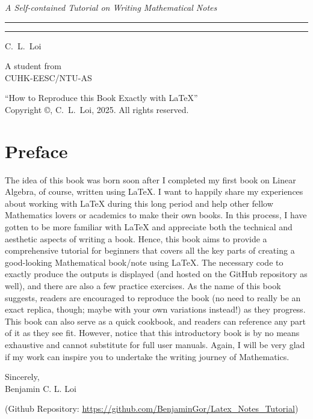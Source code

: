 \begin{titlepage}
\parbox{0.7\textwidth}{\Huge\raggedright\textbf{}}\par
\vspace{2mm}
\parbox[b]{0.9\textwidth}{\large\raggedright\textit{A Self-contained Tutorial on Writing Mathematical Notes}}
\hfill\textcolor{RoyalBlue}{\rule{3mm}{3mm}}\par
\vspace{4mm}\hrule\par
{\Large\raggedleft{}\hfill C.~L.~Loi\par}
\vfill
{\large\raggedleft A student from \\ 
CUHK-EESC/NTU-AS\par}
\end{titlepage}
\thispagestyle{empty}
\vspace*{\fill}
“How to Reproduce this Book Exactly with \LaTeX”\\
Copyright ©, C.~L.~Loi, 2025. All rights reserved.

\chapter*{Preface}

The idea of this book was born soon after I completed my first book on Linear Algebra, of course, written using \LaTeX{}. I want to happily share my experiences about working with \LaTeX{} during this long period and help other fellow Mathematics lovers or academics to make their own books. In this process, I have gotten to be more familiar with \LaTeX{} and appreciate both the technical and aesthetic aspects of writing a book. Hence, this book aims to provide a comprehensive tutorial for beginners that covers all the key parts of creating a good-looking Mathematical book/note using \LaTeX{}. The necessary code to exactly produce the outputs is displayed (and hosted on the GitHub repository as well), and there are also a few practice exercises. As the name of this book suggests, readers are encouraged to reproduce the book (no need to really be an exact replica, though; maybe with your own variations instead!) as they progress. This book can also serve as a quick cookbook, and readers can reference any part of it as they see fit. However, notice that this introductory book is by no means exhaustive and cannot substitute for full user manuals. Again, I will be very glad if my work can inspire you to undertake the writing journey of Mathematics.

{\raggedleft Sincerely, \\
Benjamin C. L. Loi 
\par}

(Github Repository: \href{https://github.com/BenjaminGor/Latex_Notes_Tutorial}{https://github.com/BenjaminGor/Latex\_Notes\_Tutorial})

\cleardoublepage
\tableofcontents